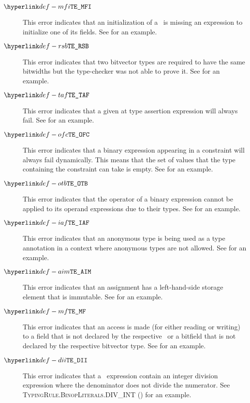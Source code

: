 \begin{description}
\hypertarget{def-mfi}{}
\item[$\MissingFieldInitializer$]
This error indicates that an initialization of a \structuredtype\ is missing an expression to initialize
one of its fields.
See  for an example.

\hypertarget{def-rsb}{}
\item[$\RequireSameBitwidths$]
This error indicates that two bitvector types are required to have the same bitwidths but the type-checker
was not able to prove it.
See  for an example.

\hypertarget{def-taf}{}
\item[$\TypeAsssertionFails$]
This error indicates that a given at type assertion expression will always fail.
See  for an example.

\hypertarget{def-ofc}{}
\item[$\BinaryOperationFailsAllConstraints$]
This error indicates that a binary expression appearing in a constraint will always fail dynamically.
This means that the set of values that the type containing
the constraint can take is empty.
See  for an example.

\hypertarget{def-otb}{}
\item[$\InvalidOperandTypesForBinop$]
This error indicates that the operator of a binary expression cannot be applied to its operand expressions
due to their types.
See  for an example.

\hypertarget{def-iaf}{}
\item[$\AnnonymousFormNotAllowedHere$]
This error indicates that an anonymous type is being used as a type annotation in a context
where anonymous types are not allowed.
See  for an example.

\hypertarget{def-aim}{}
\item[$\AssignmentToImmutable$]
This error indicates that an assignment has a left-hand-side storage element that is immutable.
See  for an example.

\hypertarget{def-mf}{}
\item[$\MissingField$]
This error indicates that an access is made (for either reading or writing) to a field that is
not declared by the respective \structuredtype\ or a bitfield that is not declared by the respective
bitvector type.
See  for an example.

\hypertarget{def-dii}{}
\item[$\DivIntIndivisible$]
This error indicates that a \staticallyevaluable\ expression contain an integer division expression where
the denominator does not divide the numerator.
See \textsc{TypingRule.BinopLiterals.DIV\_INT} () for an example.

\end{description}

% 
% 

% 
